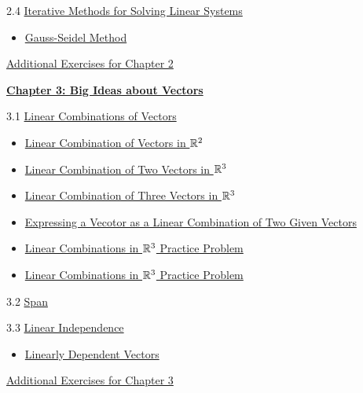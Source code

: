 \documentclass{ximera}
\begin{document}
2.4	\href{https://ximera.osu.edu/linearalgebradzv3/LinearAlgebraInteractiveIntro/SYS-0040/main}{Iterative Methods for Solving Linear Systems}
\begin{itemize}
    \item 
    \href{https://www.geogebra.org/m/hndq9nmq}{Gauss-Seidel Method}
\end{itemize}
	
\href{https://ximera.osu.edu/linearalgebradzv3/LinearAlgebraInteractiveIntro/SUPX-0020/main}{Additional Exercises for Chapter 2}
	
\href{https://ximera.osu.edu/linearalgebradzv3/LinearAlgebraInteractiveIntro/XLAChapter_bigIdeas/main}{\textbf{Chapter 3: Big Ideas about Vectors}}
	
3.1	\href{https://ximera.osu.edu/linearalgebradzv3/LinearAlgebraInteractiveIntro/VEC-0040/main}{Linear Combinations of Vectors}
\begin{itemize}
    \item 
    \href{https://www.geogebra.org/m/md3srgdg}{Linear Combination of Vectors in $\mathbb{R}^2$}
    \item \href{https://www.geogebra.org/classic/tdkfuuc9}{Linear Combination of Two Vectors in $\mathbb{R}^3$}
    \item
    \href{https://www.geogebra.org/m/zvzxujp2}{Linear Combination of Three Vectors in $\mathbb{R}^3$}
    \item
    \href{https://www.geogebra.org/m/u77b52k8}{Expressing a Vecotor as a Linear Combination of Two Given Vectors}
    \item
    \href{https://www.geogebra.org/m/kk5hwjka}{Linear Combinations in $\mathbb{R}^3$ Practice Problem}
    \item
    \href{https://www.geogebra.org/m/x9f6qnyr}{Linear Combinations in $\mathbb{R}^3$ Practice Problem}
\end{itemize}
	
3.2	\href{https://ximera.osu.edu/linearalgebradzv3/LinearAlgebraInteractiveIntro/VEC-0090/main}{Span}
	
3.3	\href{https://ximera.osu.edu/linearalgebradzv3/LinearAlgebraInteractiveIntro/VEC-0100/main}{Linear Independence}
\begin{itemize}
    \item 
    \href{https://www.geogebra.org/m/x72vbsaw}{Linearly Dependent Vectors}
\end{itemize}
	
\href{https://ximera.osu.edu/linearalgebradzv3/LinearAlgebraInteractiveIntro/SUPX-0030/main}{Additional Exercises for Chapter 3}
	
\end{document}

